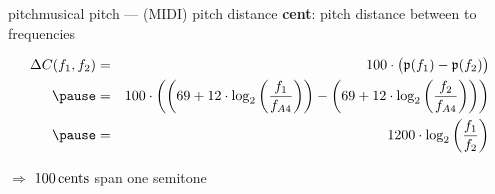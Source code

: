        \begin{frame}{pitch}{musical pitch --- (MIDI) pitch distance}
                \textbf{cent}: pitch distance between to frequencies
                \begin{footnotesize}
                \begin{eqnarray*}\label{eq:cent}
                    \Delta C(f_1,f_2)	&=& 100\cdot\big(\mathfrak{p}(f_1) - \mathfrak{p}(f_2)\big)\\
                                        \pause
                                        &=& 100\cdot\left(\left(69 + 12\cdot\log_2\left(\frac{f_1}{f_{A4}}\right)\right) - \left(69 + 12\cdot\log_2\left(\frac{f_2}{f_{A4}}\right)\right)\right)\\
                                        \pause
                                        &=& 1200\cdot\log_2\left( \frac{f_1}{f_2} \right) 
                \end{eqnarray*}
                \end{footnotesize}
                $\Rightarrow$ $\unit[100]{cents}$ span one semitone
        \end{frame}
        
